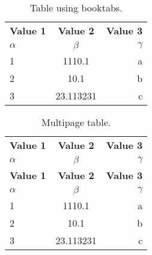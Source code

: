 \documentclass{article}
\begin{document}
\begin{table}[h!]
	\begin{center}
		\caption{Table using booktabs.}
		\label{tab:table1}
		\begin{tabular}{l|c|r}
			\toprule %
			\textbf{Value 1} & \textbf{Value 2} & \textbf{Value 3}\\
			$\alpha$ & $\beta$ & $\gamma$ \\
			\midrule %
			1 & 1110.1 & a\\
			2 & 10.1 & b\\
			3 & 23.113231 & c\\
			\bottomrule %
		\end{tabular}
	\end{center}
\end{table}

\begin{longtable}[c]{l|c|r} %
	\caption{Multipage table.}
	\label{tab:table1}\\
	\toprule
	\textbf{Value 1} & \textbf{Value 2} & \textbf{Value 3}\\
	$\alpha$ & $\beta$ & $\gamma$ \\
	\midrule
	\endfirsthead %
	\toprule
	\textbf{Value 1} & \textbf{Value 2} & \textbf{Value 3}\\
	$\alpha$ & $\beta$ & $\gamma$ \\
	\midrule
	\endhead %
	1 & 1110.1 & a\\
	2 & 10.1 & b\\
	3 & 23.113231 & c\\
	\bottomrule
\end{longtable}
\end{document}
